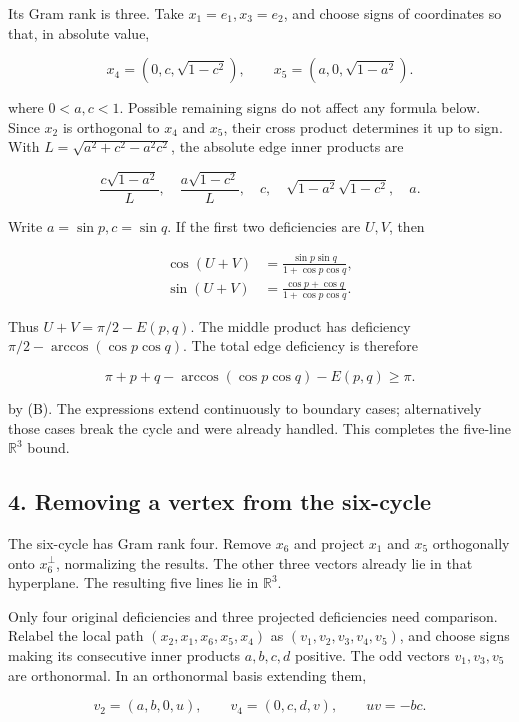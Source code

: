 \documentclass[11pt,a4paper]{article}
\begin{document}
Its Gram rank is three. Take \(x_1=e_1,x_3=e_2\), and choose signs of coordinates so that, in absolute value,

\[
x_4=(0,c,\sqrt{1-c^2}),\qquad x_5=(a,0,\sqrt{1-a^2}).
\]

where \(0<a,c<1\). Possible remaining signs do not affect any formula below. Since \(x_2\) is orthogonal to \(x_4\) and \(x_5\), their cross product determines it up to sign. With \(L=\sqrt{a^2+c^2-a^2c^2}\), the absolute edge inner products are

\[
\frac{c\sqrt{1-a^2}}{L},\quad\frac{a\sqrt{1-c^2}}{L},\quad c,\quad\sqrt{1-a^2}\sqrt{1-c^2},\quad a.
\]

Write \(a=\sin p,c=\sin q\). If the first two deficiencies are \(U,V\), then

\[
\begin{aligned}\cos(U+V)&=\frac{\sin p\sin q}{1+\cos p\cos q},\\\sin(U+V)&=\frac{\cos p+\cos q}{1+\cos p\cos q}.\end{aligned}
\]

Thus \(U+V=\pi/2-E(p,q)\). The middle product has deficiency \(\pi/2-\arccos(\cos p\cos q)\). The total edge deficiency is therefore

\[
\pi+p+q-\arccos(\cos p\cos q)-E(p,q)\ge\pi.
\]

by (B). The expressions extend continuously to boundary cases; alternatively those cases break the cycle and were already handled. This completes the five-line \(\mathbb R^3\) bound.

\subsection{4. Removing a vertex from the six-cycle}\label{removing-a-vertex-from-the-six-cycle}

The six-cycle has Gram rank four. Remove \(x_6\) and project \(x_1\) and \(x_5\) orthogonally onto \(x_6^\perp\), normalizing the results. The other three vectors already lie in that hyperplane. The resulting five lines lie in \(\mathbb R^3\).

Only four original deficiencies and three projected deficiencies need comparison. Relabel the local path \((x_2,x_1,x_6,x_5,x_4)\) as \((v_1,v_2,v_3,v_4,v_5)\), and choose signs making its consecutive inner products \(a,b,c,d\) positive. The odd vectors \(v_1,v_3,v_5\) are orthonormal. In an orthonormal basis extending them,

\[
v_2=(a,b,0,u),\qquad v_4=(0,c,d,v),\qquad uv=-bc.
\]
\end{document}
